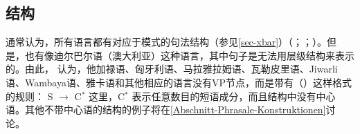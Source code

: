 
\subsection{\xbar 结构}
\label{sec-Diskussion-X-Bar}

通常认为，所有语言都有对应于\xbarc 模式的句法结构（参见\ref{sec-xbar}）（\citealp[]{Pinker94a}；\citealp[, 14]{Meisel95a}；\citealp[]{PJ2005a}）。但是，也有像迪尔巴尔语（澳大利亚）这种语言，其中句子是无法用层级结构来表示的。由此， \citet[]{Bresnan2001a}认为，他加禄语、匈牙利语、马拉雅拉姆语、瓦勒皮里语、Jiwarli语、Wambaya语、雅卡语和其他相应的语言没有VP节点，而是带有（）这样格式的规则：
\ea
S $\to$ C$^*$
\z
这里，C$^*$ 表示任意数目的短语成分，而且结构中没有中心语。其他不带中心语的结构的例子将在\ref{Abschnitt-Phrasale-Konstruktionen}讨论。

